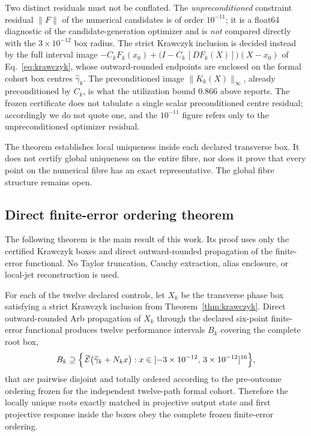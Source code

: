 \begin{remark}\label{rem:residual}
Two distinct residuals must not be conflated. The \emph{unpreconditioned} constraint
residual $\lVert F\rVert$ of the numerical candidates is of order $10^{-11}$; it is a
float64 diagnostic of the candidate-generation optimizer and is \emph{not} compared
directly with the $3\times10^{-12}$ box radius. The strict Krawczyk inclusion is decided
instead by the full interval image
$-C_{k}F_{k}(x_{0})+\bigl(I-C_{k}\,[DF_{k}(X)]\bigr)(X-x_{0})$
of Eq.~\eqref{eq:krawczyk}, whose outward-rounded endpoints are enclosed on the formal
cohort box centres $\widehat{\gamma}_{k}$. The preconditioned image
$\lVert K_{k}(X)\rVert_{\infty}$, already preconditioned by $C_{k}$, is what the
utilization bound $0.866$ above reports. The frozen certificate does not tabulate a single
scalar preconditioned centre residual; accordingly we do not quote one, and the
$10^{-11}$ figure refers only to the unpreconditioned optimizer residual.
\end{remark}

\begin{remark}
The theorem establishes local uniqueness inside each declared transverse box. It does not
certify global uniqueness on the entire fibre, nor does it prove that every point on the
numerical fibre has an exact representative. The global fibre structure remains open.
\end{remark}

\subsection{Direct finite-error ordering theorem}

The following theorem is the main result of this work. Its proof uses only the certified
Krawczyk boxes and direct outward-rounded propagation of the finite-error functional. No
Taylor truncation, Cauchy extraction, alias enclosure, or local-jet reconstruction is used.

\begin{theorem}\label{thm:ordering}
For each of the twelve declared controls, let $X_{k}$ be the transverse phase box
satisfying a strict Krawczyk inclusion from Theorem~\ref{thm:krawczyk}. Direct
outward-rounded Arb propagation of $X_{k}$ through the declared six-point finite-error
functional produces twelve performance intervals $B_{k}$ covering the complete root box,
\[
B_{k}\supseteq
\Bigl\{\,\overline{\mathcal{E}}\bigl(\widehat{\gamma}_{k}+N_{k}x\bigr):
x\in[-3\times10^{-12},\,3\times10^{-12}]^{16}\Bigr\},
\]
that are pairwise disjoint and totally
ordered according to the pre-outcome ordering frozen for the independent twelve-path
formal cohort. Therefore the locally
unique roots exactly matched in projective output state and first projective response
inside the boxes obey the complete frozen finite-error ordering.
\end{theorem}

